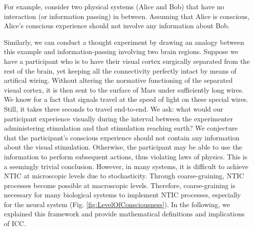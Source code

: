 		
		\begin{WritingMaterials}
		For example, consider two physical systems (Alice and Bob) that have no interaction (or information passing) in between. Assuming that Alice is conscious, Alice's conscious experience should not involve any information about Bob.
		
		Similarly, we can conduct a thought experiment by drawing an analogy between this example and information-passing involving two brain regions. Suppose we have a participant who is to have their visual cortex surgically separated from the rest of the brain, yet keeping all the connectivity perfectly intact by means of artifical wiring. Without altering the normative functioning of the separated visual cortex, it is then sent to the surface of Mars under sufficiently long wires. We know for a fact that signals travel at the speed of light on these special wires. Still, it takes three seconds to travel end-to-end. We ask: what would our participant experience visually during the interval between the experimenter administering stimulation and that stimulation reaching earth? We conjecture that the participant's conscious experience should not contain any information about the visual stimulation. Otherwise, the participant may be able to use the information to perform subsequent actions, thus violating laws of physics. This is a seemingly trivial conclusion. 
			\noindent
		However, in many systems, it is difficult to achieve NTIC at microscopic levels due to stochasticity. Through coarse-graining, NTIC processes become possible at macroscopic levels. Therefore, coarse-graining is necessary for many biological systems to implement NTIC processes, especially for the neural system (Fig. \ref{fig:LevelOfConsciousness}). In the following, we explained this framework and provide mathematical definitions and implications of ICC.  
			\noindent
		\end{WritingMaterials}
		

